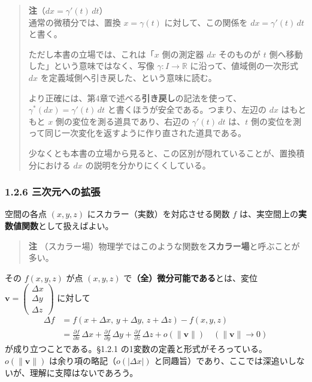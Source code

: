 \documentclass[a4paper,12pt,openany]{book}
\begin{document}
\begin{quote}
\textbf{注}（\(dx=\gamma'(t)\,dt\)）\\
通常の微積分では、置換 \(x=\gamma(t)\) に対して、この関係を
\(dx=\gamma'(t)\,dt\) と書く。

ただし本書の立場では、これは「\(x\) 側の測定器 \(dx\) そのものが \(t\)
側へ移動した」という意味ではなく、写像 \(\gamma:I\to\mathbb{R}\)
に沿って、値域側の一次形式 \(dx\)
を定義域側へ引き戻した、という意味に読む。

より正確には、第4章で述べる\textbf{引き戻し}の記法を使って、\(\gamma^\ast(dx)=\gamma'(t)\,dt\)
と書くほうが安全である。つまり、左辺の \(dx\) はもともと \(x\)
側の変位を測る道具であり、右辺の \(\gamma'(t)\,dt\) は、\(t\)
側の変位を測って同じ一次変化を返すように作り直された道具である。

少なくとも本書の立場から見ると、この区別が隠れていることが、置換積分における
\(dx\) の説明を分かりにくくしている。
\end{quote}

\hypertarget{ux4e09ux6b21ux5143ux3078ux306eux62e1ux5f35}{%
\subsubsection{1.2.6
三次元への拡張}\label{ux4e09ux6b21ux5143ux3078ux306eux62e1ux5f35}}

空間の各点 \((x,y,z)\) にスカラー（実数）を対応させる関数 \(f\)
は、実空間上の\textbf{実数値関数}として扱えばよい。

\begin{quote}
\textbf{注}
（スカラー場）物理学ではこのような関数を\textbf{スカラー場}と呼ぶことが多い。
\end{quote}

その \(f(x,y,z)\) が点 \((x,y,z)\)
で\textbf{（全）微分可能である}とは、変位
\(\mathbf{v}=\begin{pmatrix}\Delta x\\\Delta y\\\Delta z\end{pmatrix}\)
に対して \[
\begin{aligned}
\Delta f
&= f(x+\Delta x,\,y+\Delta y,\,z+\Delta z) - f(x,y,z) \\
&= \frac{\partial f}{\partial x}\,\Delta x
{}+ \frac{\partial f}{\partial y}\,\Delta y
{}+ \frac{\partial f}{\partial z}\,\Delta z
{}+ o(\|\mathbf{v}\|) \quad (\|\mathbf{v}\|\to 0)
\end{aligned}
\] が成り立つことである。§1.2.1
の1変数の定義と形式がそろっている。\(o(\|\mathbf{v}\|)\)
は余り項の略記（\(o(|\Delta x|)\)
と同趣旨）であり、ここでは深追いしないが、理解に支障はないであろう。
\end{document}
